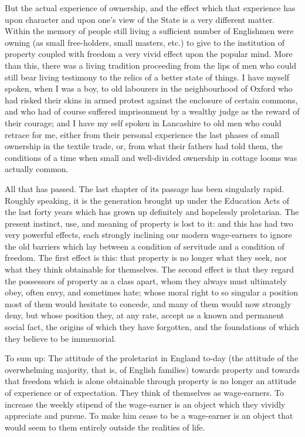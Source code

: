 \documentclass{book}
\begin{document}
But the actual experience of ownership, and the effect which that experience has upon character and upon one’s view of the State is a very different matter. Within the memory of people still living a sufficient number of Englishmen were owning (as small free-holders, small masters, etc.) to give to the institution of property coupled with freedom a very vivid effect upon the popular mind. More than this, there was a living tradition proceeding from the lips of men who could still bear living testimony to the relics of a better state of things. I have myself spoken, when I was a boy, to old labourers in the neighbourhood of Oxford who had risked their skins in armed protest against the enclosure of certain commons, and who had of course suffered imprisonment by a wealthy judge as the reward of their courage; and I have my self spoken in Lancashire to old men who could retrace for me, either from their personal experience the last phases of small ownership in the textile trade, or, from what their fathers had told them, the conditions of a time when small and well-divided ownership in cottage looms was actually common.

All that has passed. The last chapter of its passage has been singularly rapid. Roughly speaking, it is the generation brought up under the Education Acts of the last forty years which has grown up definitely and hopelessly proletarian. The present instinct, use, and meaning of property is lost to it: and this has had two very powerful effects, each strongly inclining our modern wage-earners to ignore the old barriers which lay between a condition of servitude and a condition of freedom. The first effect is this: that property is no longer what they seek, nor what they think obtainable for themselves. The second effect is that they regard the possessors of property as a class apart, whom they always must ultimately obey, often envy, and sometimes hate; whose moral right to so singular a position most of them would hesitate to concede, and many of them would now strongly deny, but whose position they, at any rate, accept as a known and permanent social fact, the origins of which they have forgotten, and the foundations of which they believe to be immemorial.

To sum up: The attitude of the proletariat in England to-day (the attitude of the overwhelming majority, that is, of English families) towards property and towards that freedom which is alone obtainable through property is no longer an attitude of experience or of expectation. They think of themselves as wage-earners. To increase the weekly stipend of the wage-earner is an object which they vividly appreciate and pursue. To make him cease to be a wage-earner is an object that would seem to them entirely outside the realities of life.
\end{document}
